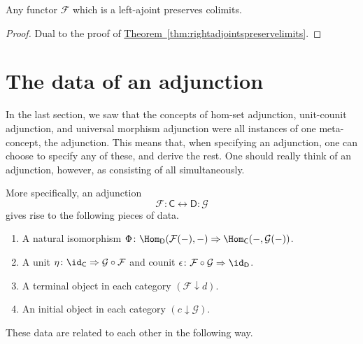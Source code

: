 \documentclass[notes.tex]{subfiles}
\begin{document}
\begin{corollary}
  \label{cor:leftadjointspreservecolimits}
  Any functor $\mathcal{F}$ which is a left-ajoint preserves colimits.
\end{corollary}
\begin{proof}
  Dual to the proof of \hyperref[thm:rightadjointspreservelimits]{Theorem~\ref*{thm:rightadjointspreservelimits}}.
\end{proof}

\section{The data of an adjunction}
\label{sec:the_data_of_an_adjunction}

In the last section, we saw that the concepts of hom-set adjunction, unit-counit adjunction, and universal morphism adjunction were all instances of one meta-concept, the adjunction. This means that, when specifying an adjunction, one can choose to specify any of these, and derive the rest. One should really think of an adjunction, however, as consisting of all simultaneously.

More specifically, an adjunction
\begin{equation*}
  \mathcal{F} : \mathsf{C} \leftrightarrow \mathsf{D} : \mathcal{G}
\end{equation*}
gives rise to the following pieces of data.
\begin{enumerate}
  \item A natural isomorphism $\Phi\colon \Hom_{\mathsf{D}}(\mathcal{F}(-), -) \Rightarrow \Hom_{\mathsf{C}}(-, \mathcal{G}(-))$.

  \item A unit $\eta\colon \id_{\mathsf{C}} \Rightarrow \mathcal{G} \circ \mathcal{F}$ and counit $\epsilon\colon \mathcal{F} \circ \mathcal{G} \Rightarrow \id_{\mathsf{D}}$.

  \item A terminal object in each category $(\mathcal{F} \downarrow d)$.

  \item An initial object in each category $(c \downarrow \mathcal{G})$.
\end{enumerate}

These data are related to each other in the following way.
\end{document}
